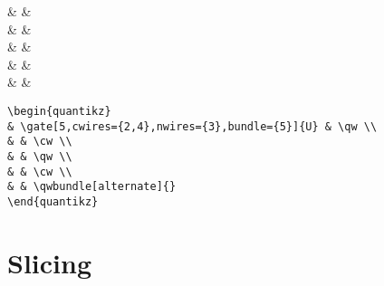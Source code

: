 \documentclass[aps,pra,10pt,nofootinbib]{revtex4}
\begin{document}
\begin{Code}
\begin{center}
\begin{quantikz}
&  & \qw \\
& & \cw \\
& & \qw \\
& & \cw \\
& & \qwbundle[alternate]{}
\end{quantikz}
\end{center}
\tcblower
\begin{lstlisting}
\begin{quantikz}
& \gate[5,cwires={2,4},nwires={3},bundle={5}]{U} & \qw \\
& & \cw \\
& & \qw \\
& & \cw \\
& & \qwbundle[alternate]{}
\end{quantikz}
\end{lstlisting}
\end{Code}

\section{Slicing}
\end{document}
